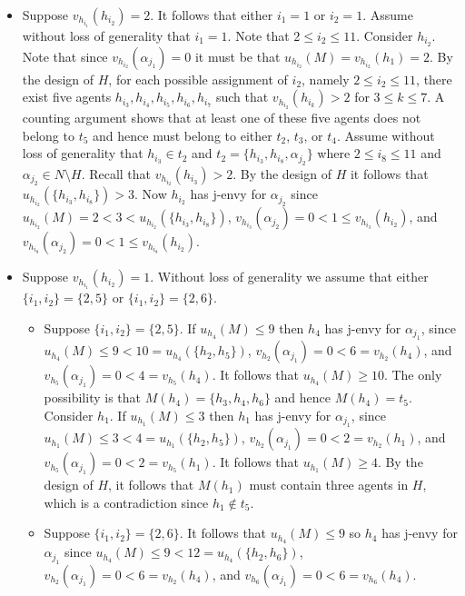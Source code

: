 \begin{itemize}
\begin{itemize}
\end{itemize}
\item Suppose $v_{h_{i_1}}(h_{i_2}) = 2$. It follows that either $i_1 = 1$ or $i_2 = 1$. Assume without loss of generality that $i_1 = 1$. Note that $2 \leq i_2 \leq 11$. Consider $h_{i_2}$. Note that since $v_{h_{i_2}}(\alpha_{j_1})=0$ it must be that $u_{h_{i_2}}(M) = v_{h_{i_2}}(h_1) = 2$. By the design of $H$, for each possible assignment of $i_2$, namely $2 \leq i_2 \leq 11$, there exist five agents $h_{i_3}, h_{i_4}, h_{i_5}, h_{i_6}, h_{i_7}$ such that $v_{h_{i_2}}(h_{i_k}) > 2$ for $3 \leq k \leq 7$. A counting argument shows that at least one of these five agents does not belong to $t_5$ and hence must belong to either $t_2$, $t_3$, or $t_4$. Assume without loss of generality that $h_{i_3} \in t_2$ and $t_2 = \{ h_{i_3}, h_{i_8}, \alpha_{j_2} \}$ where $2 \leq i_8 \leq 11$ and $\alpha_{j_2} \in N \setminus H$. Recall that $v_{h_{i_2}}(h_{i_3}) > 2$. By the design of $H$ it follows that $u_{h_{i_2}}(\{ h_{i_3}, h_{i_8} \}) > 3$. Now $h_{i_2}$ has j-envy for $\alpha_{j_2}$ since $u_{h_{i_2}}(M) = 2 < 3 < u_{h_{i_2}}(\{ h_{i_3}, h_{i_8} \})$, $v_{h_{i_3}}(\alpha_{j_2}) = 0 < 1 \leq v_{h_{i_3}}(h_{i_2})$, and $v_{h_{i_8}}(\alpha_{j_2}) = 0 < 1 \leq v_{h_{i_8}}(h_{i_2})$.
\item Suppose $v_{h_{i_1}}(h_{i_2}) = 1$. Without loss of generality we assume that either $\{ i_1, i_2 \} = \{ 2, 5 \}$ or $\{ i_1, i_2 \} = \{ 2, 6 \}$.
\begin{itemize}
    \item Suppose $\{ i_1, i_2 \} = \{ 2, 5 \}$. If $u_{h_{4}}(M) \leq 9$ then $h_{4}$ has j-envy for $\alpha_{j_1}$, since $u_{h_{4}}(M) \leq 9 < 10 = u_{h_{4}}(\{ h_2, h_5 \})$, $v_{h_2}(\alpha_{j_1}) = 0 < 6 = v_{h_2}(h_{4})$, and $v_{h_5}(\alpha_{j_1}) = 0 < 4 = v_{h_5}(h_{4})$. It follows that $u_{h_{4}}(M) \geq 10$. The only possibility is that $M(h_4) = \{ h_3, h_4, h_{6} \}$ and hence $M(h_4) = t_5$. Consider $h_1$. If $u_{h_1}(M) \leq 3$ then $h_1$ has j-envy for $\alpha_{j_1}$, since $u_{h_1}(M) \leq 3 < 4 = u_{h_1}(\{ h_2, h_5 \})$, $v_{h_2}(\alpha_{j_1}) = 0 < 2 = v_{h_2}(h_1)$, and $v_{h_5}(\alpha_{j_1}) = 0 < 2 = v_{h_5}(h_1)$. It follows that $u_{h_1}(M) \geq 4$. By the design of $H$, it follows that $M(h_1)$ must contain three agents in $H$, which is a contradiction since $h_1 \notin t_5$.
    \item Suppose $\{ i_1, i_2 \} = \{ 2, 6 \}$. It follows that $u_{h_4}(M) \leq 9$ so $h_4$ has j-envy for $\alpha_{j_1}$ since $u_{h_4}(M) \leq 9 < 12 = u_{h_4}(\{ h_2, h_6 \})$, $v_{h_2}(\alpha_{j_1}) = 0 < 6 = v_{h_2}(h_4)$, and $v_{h_6}(\alpha_{j_1}) = 0 < 6 = v_{h_6}(h_4)$.
\end{itemize}
\end{itemize}
